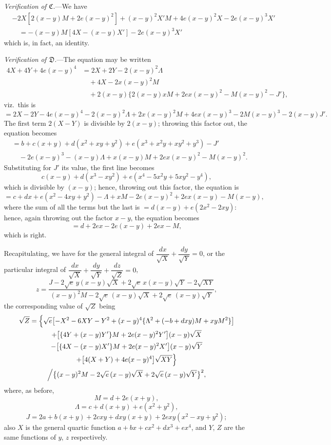 \documentclass[11pt]{article}
\begin{document}
\medskip
\noindent\textit{Verification of $\mathfrak{C}$.}---We have
\begin{align*}
&-2X[2(x - y)M + 2e(x - y)^2] + (x - y)^2 X'M + 4e(x - y)^2 X - 2e(x - y)^3 X'\\
&\quad= -(x - y)M[4X - (x - y)X'] - 2e(x - y)^3 X'
\end{align*}
which is, in fact, an identity.

\medskip
\noindent\textit{Verification of $\mathfrak{D}$.}---The equation may be written
\begin{align*}
4X + 4Y + 4e(x - y)^4 &= 2X + 2Y - 2(x - y)^2\Lambda\\
&\quad + 4X - 2x(x - y)^2 M\\
&\quad + 2(x - y)\bigl\{2(x - y)xM + 2ex(x - y)^2 - M(x - y)^2 - J'\bigr\},
\end{align*}
viz.\ this is
\[
= 2X - 2Y - 4e(x - y)^4 - 2(x - y)^2\Lambda + 2x(x - y)^2 M + 4ex(x - y)^3 - 2M(x - y)^3 - 2(x - y)J'.
\]
The first term $2(X - Y)$ is divisible by $2(x - y)$; throwing this factor out, the equation becomes
\begin{align*}
&= b + c(x + y) + d(x^2 + xy + y^2) + e(x^3 + x^2 y + xy^2 + y^3) - J'\\
&\quad - 2e(x - y)^3 - (x - y)\Lambda + x(x - y)M + 2ex(x - y)^2 - M(x - y)^2.
\end{align*}
Substituting for $J'$ its value, the first line becomes
\[
c(x - y) + d(x^3 - xy^2) + e(x^4 - 5x^2 y + 5xy^2 - y^4),
\]
which is divisible by $(x - y)$; hence, throwing out this factor, the equation is
\[
= c + dx + e(x^2 - 4xy + y^2) - \Lambda + xM - 2e(x - y)^2 + 2ex(x - y) - M(x - y),
\]
where the sum of all the terms but the last is $= d(x - y) + e(2x^2 - 2xy)$: hence, again throwing out the factor $x - y$, the equation becomes
\[
= d + 2ex - 2e(x - y) + 2ex - M,
\]
which is right.

\medskip

Recapitulating, we have for the general integral of $\dfrac{dx}{\sqrt{X}} + \dfrac{dy}{\sqrt{Y}} = 0$, or the particular integral of $\dfrac{dx}{\sqrt{X}} + \dfrac{dy}{\sqrt{Y}} + \dfrac{dz}{\sqrt{Z}} = 0$,
\[
z = \dfrac{J - 2\sqrt{e}\,y(x - y)\sqrt{X} + 2\sqrt{e}\,x(x - y)\sqrt{Y} - 2\sqrt{XY}}{(x - y)^2 M - 2\sqrt{e}\,(x - y)\sqrt{X} + 2\sqrt{e}\,(x - y)\sqrt{Y}},
\]
the corresponding value of $\sqrt{Z}$ being
\begin{multline*}
\sqrt{Z} = \Bigl\{\sqrt{e}\bigl[-X^2 - 6XY - Y^2 + (x - y)^4\{\Lambda^2 + (-b + dxy)M + xyM^2\}\bigr]\\
+ \bigl[\{4Y + (x - y)Y'\}M + 2e(x - y)^2 Y'\bigr](x - y)\sqrt{X}\\
- \bigl[\{4X - (x - y)X'\}M + 2e(x - y)^2 X'\bigr](x - y)\sqrt{Y}\\
+ \bigl[4(X + Y) + 4e(x - y)^4\bigr]\sqrt{XY}\Bigr\}\\
\Big/ \bigl\{(x - y)^2 M - 2\sqrt{e}\,(x - y)\sqrt{X} + 2\sqrt{e}\,(x - y)\sqrt{Y}\bigr\}^2,
\end{multline*}
where, as before,
\[
M = d + 2e(x + y),
\]
\[
\Lambda = c + d(x + y) + e(x^2 + y^2),
\]
\[
J = 2a + b(x + y) + 2cxy + dxy(x + y) + 2exy(x^2 - xy + y^2);
\]
also $X$ is the general quartic function $a + bx + cx^2 + dx^3 + ex^4$, and $Y$, $Z$ are the same functions of $y$, $z$ respectively.
\end{document}
